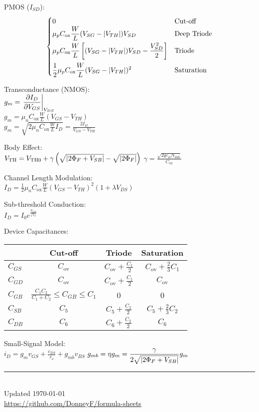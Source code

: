 \documentclass[12pt,landscape]{article}
\newcommand{\tab}{\hspace*{1em}}
\newcommand{\ds}{\displaystyle}
\theoremstyle{definition}
\begin{document}
\begin{multicols}{3}
\tab PMOS ($I_{SD}$):
\begin{equation*}
\begin{cases}
0 & \text{Cut-off}\\
\ds \mu_p C_\text{ox} \frac{W}{L} (V_{SG} - \abs{V_{TH}}) V_{SD} & \text{Deep Triode}\\[0.5em]
\ds \mu_p C_\text{ox} \frac{W}{L} \left[(V_{SG} - \abs{V_{TH}}) V_{SD} - \frac{V_{SD}^2}{2}\right] & \text{Triode}\\[1em]
\ds \frac{1}{2} \mu_p C_\text{ox} \frac{W}{L} (V_{SG} - \abs{V_{TH}})^2 & \text{Saturation}
\end{cases}
\end{equation*}

Transconductance (NMOS):\\
\tab $\ds g_m = \eval{\pdv{I_D}{V_{GS}}}_{V_{DS}}$\\
\tab $\ds g_m = \mu_n C_\text{ox} \frac{W}{L} (V_{GS} - V_{TH})$\\
\tab $\ds g_m = \sqrt{2\mu_n C_\text{ox} \frac{W}{L} I_D} = \frac{2I_D}{V_{GS} - V_{TH}}$

Body Effect:\\
\tab $V_\text{TH} = V_\text{TH0} + \gamma\left(\sqrt{\abs{2\Phi_F + V_{SB}}} - \sqrt{\abs{2\Phi_F}}\right)$
\tab $\ds \gamma = \frac{\sqrt{2q\varepsilon_\text{si}N_\text{sub}}}{C_\text{ox}}$

Channel Length Modulation:\\
\tab $\ds I_D = \frac{1}{2} \mu_n C_\text{ox} \frac{W}{L} (V_{GS} - V_{TH})^2 (1 + \lambda V_{DS})$

Sub-threshold Conduction:\\
\tab $I_D = I_0 e^{\frac{V_{GS}}{\zeta V_T}}$

Device Capacitances:\\
\bgroup
\def\arraystretch{1.2}%
\tab \begin{tabular}{|l|c | c |c |} 
\hline
& Cut-off & Triode & Saturation\\
\hline
$C_{GS}$ & $C_\text{ov}$ & $C_\text{ov} + \frac{C_1}{2}$ & $C_\text{ov} + \frac{2}{3}C_1$\\
\hline
$C_{GD}$ & $C_\text{ov}$ & $C_\text{ov} + \frac{C_1}{2}$ & $C_\text{ov}$\\
\hline
$C_{GB}$ & $\frac{C_1 C_2}{C_1 + C_2} \leq C_{GB} \leq C_1$ & 0 & 0\\
\hline
$C_{SB}$ & $C_5$ & $C_5 + \frac{C_2}{2}$ & $C_5 + \frac{2}{3}C_2$\\
\hline
$C_{DB}$ & $C_6$ & $C_6 + \frac{C_2}{2}$ & $C_6$\\
\hline
\end{tabular}
\egroup

Small-Signal Model:\\
\tab $\ds i_D = g_m v_{GS} + \frac{v_{DS}}{r_o} + g_{mb}v_{BS}$
\tab $\ds g_{mb} = \eta g_m = \frac{\gamma}{2\sqrt{\abs{2\Phi_F + V_{SB}}}} g_m$

\rule{0.3\linewidth}{0.25pt}
\scriptsize\\
Updated \today\\
\href{https://github.com/DonneyF/formula-sheets}{https://github.com/DonneyF/formula-sheets}
\end{multicols}%
\end{document}
